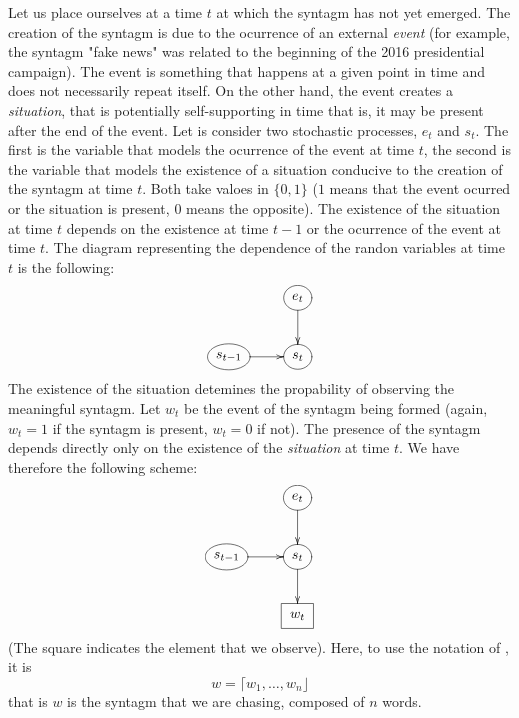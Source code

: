 \documentclass[10pt]{article}
\newcommand{\dqt}[1]        {"{#1}"}
\def\emph{\textsl}
\newcommand{\synt}[1]     {\lceil{#1}\rfloor}
\def\st{s}
\def\ev{e}
\begin{document}
Let us place ourselves at a time $t$ at which the syntagm has not yet
emerged. The creation of the syntagm is due to the ocurrence of an
external \emph{event} (for example, the syntagm \dqt{fake news} was
related to the beginning of the 2016 presidential campaign). The event
is something that happens at a given point in time and does not
necessarily repeat itself. On the other hand, the event creates a
\emph{situation}, that is potentially self-supporting in time that is,
it may be present after the end of the event. Let is consider two
stochastic processes, $\ev_t$ and $s_t$. The first is the variable
that models the ocurrence of the event at time $t$, the second is the
variable that models the existence of a situation conducive to the
creation of the syntagm at time $t$. Both take valoes in $\{0,1\}$
($1$ means that the event ocurred or the situation is present, $0$
means the opposite). The existence of the situation at time $t$
depends on the existence at time $t-1$ or the ocurrence of the event
at time $t$. The diagram representing the dependence of the randon
variables at time $t$ is the following:
%
%
\begin{equation}
  \xymatrix{
    & *++[o][F]{\ev_t} \ar[d] \\
    *++[o][F]{\st_{t-1}} \ar[r] & *++[o][F]{\st_t} 
  }
\end{equation}
%
%
The existence of the situation detemines the propability of observing
the meaningful syntagm. Let $w_t$ be the event of the syntagm being
formed (again, $w_t=1$ if the syntagm is present, $w_t=0$ if
not). The presence of the syntagm depends directly only on the
existence of the \emph{situation} at time $t$. We have therefore the
following scheme:
%
%
\begin{equation}
  \xymatrix{
    & *++[o][F]{\ev_t} \ar[d] \\
    *++[o][F]{\st_{t-1}} \ar[r] & *++[o][F]{\st_t} \ar[d] \\
    & *++[F]{w_t}
  }
\end{equation}
%
%
(The square indicates the element that we observe). Here, to use the
notation of \cite{shang:2018}, it is
%
%
\begin{equation}
  w = \synt{w_1,\ldots,w_n}
\end{equation}
%
%
that is $w$ is the syntagm that we are chasing, composed of $n$ words.
\end{document}
